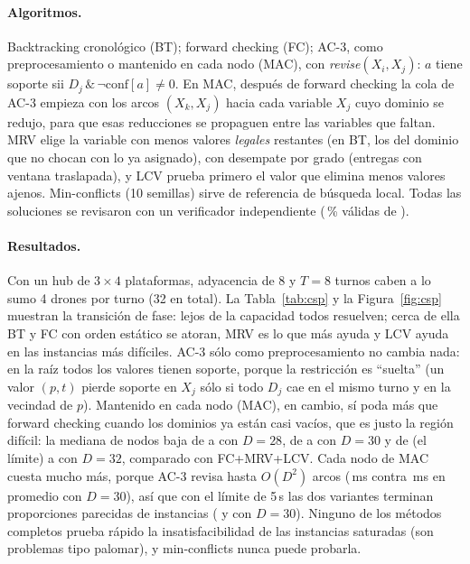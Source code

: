 \documentclass[11pt]{article}
\theoremstyle{remark}
\begin{document}
\paragraph{Algoritmos.} Backtracking cronológico (BT); forward checking (FC); AC-3, como
preprocesamiento o mantenido en cada nodo (MAC), con \emph{revise}$(X_i,X_j)$: $a$ tiene soporte sii
$D_j\,\&\,\neg\text{conf}[a]\neq0$. En MAC, después de forward checking la cola de AC-3 empieza con los
arcos $(X_k,X_j)$ hacia cada variable $X_j$ cuyo dominio se redujo, para que esas reducciones se
propaguen entre las variables que faltan. MRV elige la variable con menos valores \emph{legales}
restantes (en BT, los del dominio que no chocan con lo ya asignado), con desempate por grado (entregas
con ventana traslapada), y LCV prueba primero el valor que elimina menos valores ajenos. Min-conflicts (10 semillas) sirve de referencia de
búsqueda local. Todas las soluciones se revisaron con un verificador independiente
(\cspValidas\,\% válidas de \cspSoluciones).

\paragraph{Resultados.} Con un hub de $3\times4$ plataformas, adyacencia de 8 y $T=8$ turnos caben
a lo sumo 4 drones por turno (32 en total). La Tabla~\ref{tab:csp} y la Figura~\ref{fig:csp} muestran
la transición de fase: lejos de la capacidad todos resuelven; cerca de ella BT y FC con orden
estático se atoran, MRV es lo que más ayuda y LCV ayuda en las instancias más difíciles. AC-3 sólo
como preprocesamiento no cambia nada: en la raíz todos los valores tienen soporte, porque la restricción
es ``suelta'' (un valor $(p,t)$ pierde soporte en $X_j$ sólo si todo $D_j$ cae en el mismo turno y en la
vecindad de $p$). Mantenido en cada nodo (MAC), en cambio, sí poda más que forward checking cuando los
dominios ya están casi vacíos, que es justo la región difícil: la mediana de nodos baja de \cspNodFcDCI{}
a \cspNodMacDCI{} con $D=28$, de \cspNodFcDDA{} a \cspNodMacDDA{} con $D=30$ y de \cspNodFcDDC{} (el límite) a
\cspNodMacDDC{} con $D=32$, comparado con FC+MRV+LCV. Cada nodo de MAC cuesta mucho más, porque AC-3
revisa hasta $O(D^2)$ arcos (\cspTMacDDA\,ms contra \cspTFcDDA\,ms en promedio con $D=30$), así que con el
límite de 5\,s las dos variantes terminan proporciones parecidas de instancias (\cspDoneMacDDA{} y
\cspDoneFcDDA{} con $D=30$). Ninguno de los métodos completos prueba rápido la insatisfacibilidad de las
instancias saturadas (son problemas tipo palomar), y min-conflicts nunca puede probarla.
\end{document}
